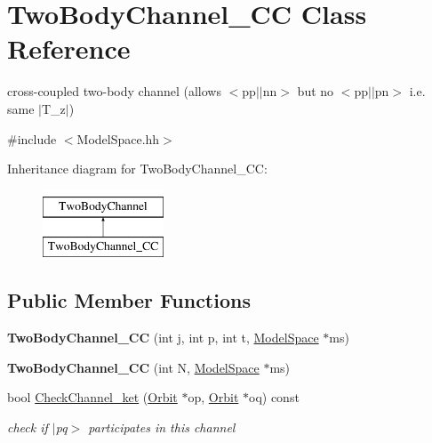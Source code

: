 \hypertarget{classTwoBodyChannel__CC}{}\section{Two\+Body\+Channel\+\_\+\+CC Class Reference}
\label{classTwoBodyChannel__CC}


cross-\/coupled two-\/body channel (allows $<$pp$\vert$$\vert$nn$>$ but no $<$pp$\vert$$\vert$pn$>$ i.\+e. same $\vert$\+T\+\_\+z$\vert$)  




{\ttfamily \#include $<$Model\+Space.\+hh$>$}

Inheritance diagram for Two\+Body\+Channel\+\_\+\+CC\+:\begin{figure}[H]
\begin{center}
\leavevmode
\includegraphics[height=2.000000cm]{classTwoBodyChannel__CC}
\end{center}
\end{figure}
\subsection*{Public Member Functions}
\begin{DoxyCompactItemize}
\item 
\mbox{\label{classTwoBodyChannel__CC_add1c09d721a004cf2280111746ade74f}} 
{\bfseries Two\+Body\+Channel\+\_\+\+CC} (int j, int p, int t, \hyperlink{classModelSpace}{Model\+Space} $\ast$ms)
\item 
\mbox{\label{classTwoBodyChannel__CC_ac10877d81204c16e095417d5eb7daa95}} 
{\bfseries Two\+Body\+Channel\+\_\+\+CC} (int N, \hyperlink{classModelSpace}{Model\+Space} $\ast$ms)
\item 
bool \hyperlink{classTwoBodyChannel__CC_a9a73ccfd9ba18bbc840547669254ef79}{Check\+Channel\+\_\+ket} (\hyperlink{classOrbit}{Orbit} $\ast$op, \hyperlink{classOrbit}{Orbit} $\ast$oq) const
\begin{DoxyCompactList}\small\item\em check if $\vert$pq$>$ participates in this channel \end{DoxyCompactList}\end{DoxyCompactItemize}
